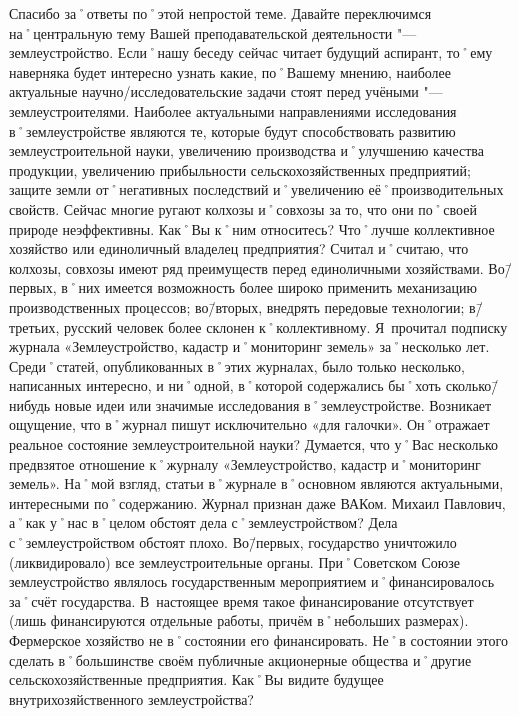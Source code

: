 \begin{drama}
	\maxspeaks Спасибо за˚ответы по˚этой непростой теме. Давайте переключимся на˚центральную тему Вашей преподавательской деятельности "--- землеустройство.
Если˚нашу беседу сейчас читает будущий аспирант, то˚ему наверняка будет интересно узнать какие, по˚Вашему мнению, наиболее актуальные научно\-/исследовательские задачи стоят перед учёными "--- землеустроителями.
	\michaelspeaks Наиболее актуальными направлениями исследования в˚землеустройстве являются те, которые будут способствовать развитию землеустроительной науки, увеличению производства и˚улучшению качества продукции, увеличению прибыльности сельскохозяйственных предприятий; защите земли от˚негативных последствий и˚увеличению её˚производительных свойств.
	\maxspeaks Сейчас многие ругают колхозы и˚совхозы за то, что они по˚своей природе неэффективны. Как˚Вы к˚ним относитесь? Что˚лучше коллективное хозяйство или единоличный владелец предприятия?
	\michaelspeaks Считал и˚считаю, что колхозы, совхозы имеют ряд преимуществ перед единоличными хозяйствами. Во\=/первых, в˚них имеется возможность более широко применить механизацию производственных процессов; во\=/вторых, внедрять передовые технологии; в\=/третьих, русский человек более склонен к˚коллективному.
	\maxspeaks Я~прочитал подписку журнала «Землеустройство, кадастр и˚мониторинг земель» за˚несколько лет. Среди˚статей, опубликованных в˚этих журналах, было только несколько, написанных интересно, и ни˚одной, в˚которой содержались бы˚хоть сколько\=/нибудь новые идеи или значимые исследования в˚землеустройстве. Возникает ощущение, что в˚журнал пишут исключительно  «для галочки». Он˚отражает реальное состояние землеустроительной науки?
	\michaelspeaks Думается, что у˚Вас несколько предвзятое отношение к˚журналу «Землеустройство, кадастр и˚мониторинг земель». На˚мой взгляд, статьи в˚журнале в˚основном являются актуальными, интересными по˚содержанию. Журнал признан даже ВАКом. 
	\maxspeaks Михаил Павлович, а˚как у˚нас в˚целом обстоят дела с˚землеустройством?
	\michaelspeaks Дела с˚землеустройством обстоят плохо. Во\=/первых, государство уничтожило (ликвидировало) все землеустроительные органы. При˚Советском Союзе землеустройство являлось государственным мероприятием и˚финансировалось за˚счёт государства. В~настоящее время такое финансирование отсутствует (лишь финансируются отдельные работы, причём в˚небольших размерах). Фермерское хозяйство не в˚состоянии его финансировать. Не˚в состоянии этого сделать в˚большинстве своём публичные акционерные общества и˚другие сельскохозяйственные предприятия.
	\maxspeaks Как˚Вы видите будущее внутрихозяйственного землеустройства?

\end{drama}
